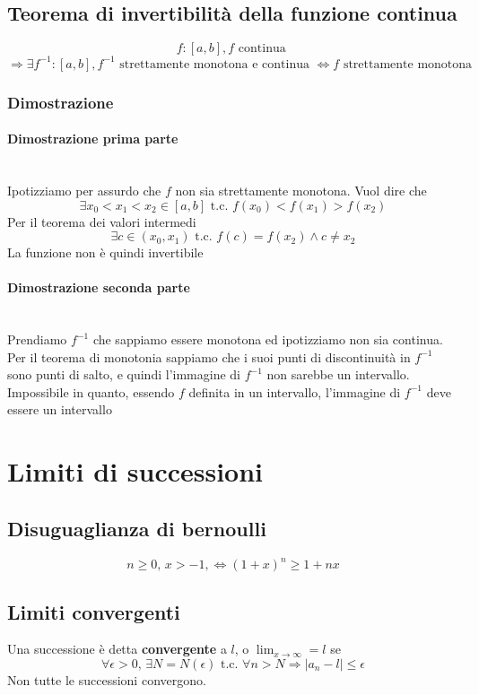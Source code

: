 \documentclass{report}
\newcommand{\subsubsubsection}[1]{\paragraph{#1}\mbox{}\\}
\begin{document}
    \subsection{Teorema di invertibilità della funzione continua}
        $$f: \left[a, b\right], f \textrm{ continua }$$
        $$\Longrightarrow \exists f^{-1}: \left[a, b\right], f^{-1}\textrm{ strettamente monotona e continua } 
            \Longleftrightarrow f \textrm{ strettamente monotona }$$
        \subsubsection{Dimostrazione}
            \subsubsubsection{Dimostrazione prima parte}
                Ipotizziamo per assurdo che $f$ non sia strettamente monotona. Vuol dire che
                $$\exists x_0 < x_1 < x_2 \in \left[a, b\right] \textrm{ t.c. } f\left(x_0\right) < f\left(x_1\right) > f\left(x_2\right)$$
                Per il teorema dei valori intermedi
                $$\exists c \in \left(x_0, x_1\right) \textrm{ t.c. } f\left(c\right) = f\left(x_2\right) \wedge c \neq x_2$$
                La funzione non è quindi invertibile
            \subsubsubsection{Dimostrazione seconda parte}
                Prendiamo $f^{-1}$ che sappiamo essere monotona ed ipotizziamo non sia continua. 
                Per il teorema di monotonia sappiamo che i suoi punti di discontinuità in $f^{-1}$ 
                sono punti di salto, e quindi l'immagine di $f^{-1}$ non sarebbe un intervallo.
                Impossibile in quanto, essendo $f$ definita in un intervallo, l'immagine di 
                $f^{-1}$ deve essere un intervallo
\section{Limiti di successioni}
    \subsection{Disuguaglianza di bernoulli}
        $$n \geq 0,\, x > -1, \Longleftrightarrow \left(1+x\right)^n \geq 1 + nx$$
    \subsection{Limiti convergenti}
        Una successione è detta \textbf{convergente} a $l$, o $\lim_{x \to \infty} = l$ se 
        $$\forall\epsilon > 0,\, \exists N = N\left(\epsilon\right) \textrm{ t.c. } \forall n > N \Longrightarrow
        |a_n - l| \leq \epsilon$$
        Non tutte le successioni convergono.
\end{document}
